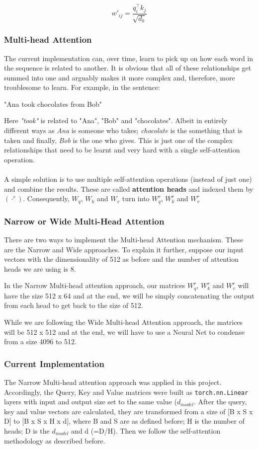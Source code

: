 \documentclass[12pt,a4paper,twoside,openright]{report}
\newcommand{\changedFont}[1]{{\fontfamily{qcr}\selectfont #1}}
\begin{document}
\[ w'_{ij} = \frac{q_i^\top k_j}{\sqrt{d_k}} \]

\subsubsection{Multi-head Attention}

The current implementation can, over time, learn to pick up on how each word in the sequence is related to another. It is obvious that all of these relationships get summed into one and arguably makes it more complex and, therefore, more troublesome to learn. For example, in the sentence:
\begin{center}
    \changedFont{ "Ana took chocolates from Bob"}
\end{center}
Here \textit{"took"} is related to "Ana", "Bob" and "chocolates". Albeit in entirely different ways as \textit{Ana} is someone who takes; \textit{chocolate} is the something that is taken and finally, \textit{Bob} is the one who gives. This is just one of the complex relationships that need to be learnt and very hard with a single self-attention operation.
\\\\
A simple solution is to use multiple self-attention operations (instead of just one) and combine the results. These are called \textbf{attention heads} and indexed them by $(\cdot^r)$. Consequently, $W_q$, $W_k$ and $W_v$ turn into $W^r_q$, $W^r_k$ and $W^r_v$

\subsubsection{Narrow or Wide Multi-Head Attention}

There are two ways to implement the Multi-head Attention mechanism. These are the Narrow and Wide approaches. To explain it further, suppose our input vectors with the dimensionality of 512 as before and the number of attention heads we are using is 8.

In the Narrow Multi-head attention approach, our matrices $W^r_q$, $W^r_k$ and $W^r_v$ will have the size 512 x 64 and at the end, we will be simply concatenating the output from each head to get back to the size of 512.

While we are following the Wide Multi-head Attention approach, the matrices will be 512 x 512 and at the end, we will have to use a Neural Net to condense from a size 4096 to 512.

\subsubsection{Current Implementation}
The Narrow Multi-head attention approach was applied in this project. Accordingly, the Query, Key and Value matrices were built as \lstinline{torch.nn.Linear} layers with input and output size set to the same value ($d_{model}$. After the query, key and value vectors are calculated, they are transformed from a size of [B x S x D] to [B x S x H x d], where B and S are as defined before; H is the number of heads; D is the $d_{model}$ and d (=D/H). Then we follow the self-attention methodology as described before.
\end{document}
